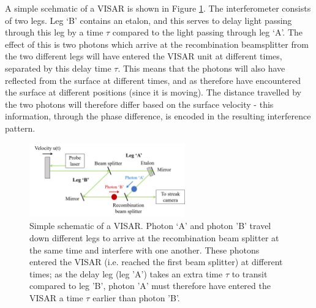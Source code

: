 A simple scehmatic of a VISAR is shown in Figure \ref{fig:VISAR_Schematic}. The interferometer consists of two legs. Leg `B' contains an etalon, and this serves to delay light passing through this leg by a time $\tau$ compared to the light passing through leg `A'. The effect of this is two photons which arrive at the recombination beamsplitter from the two different legs will have entered the VISAR unit at different times, separated by this delay time $\tau$. This means that the photons will also have reflected from the surface at different times, and as therefore have encountered the surface at different positions (since it is moving). The distance travelled by the two photons will therefore differ based on the surface velocity - this information, through the phase difference, is encoded in the resulting interference pattern.

\begin{figure}
\centering
\includegraphics[width=0.6\textwidth]{figures/Experiment/VISARSchematic.png}%
\caption{\label{fig:VISAR_Schematic} Simple schematic of a VISAR. Photon `A' and photon 'B' travel down different legs to arrive at the recombination beam splitter at the same time and interfere with one another. These photons entered the VISAR (i.e. reached the first beam splitter) at different times; as the delay leg (leg 'A') takes an extra time $\tau$ to transit compared to leg 'B', photon 'A' must therefore have entered the VISAR a time $\tau$ earlier than photon 'B'.}
\end{figure}

